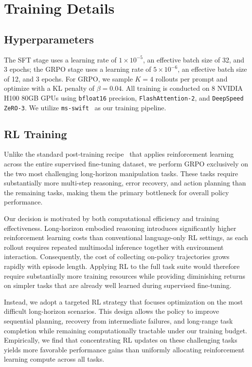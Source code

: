 \documentclass{llmxive}
\begin{document}
\section{Training Details}
\subsection{Hyperparameters}
The SFT stage uses a learning rate of $1\times10^{-5}$, an effective batch size of 32, and 3 epochs; the GRPO stage uses a learning rate of $5\times10^{-6}$, an effective batch size of 12, and 3 epochs.
For GRPO, we sample $K=4$ rollouts per prompt and optimize with a KL penalty of $\beta=0.04$. 
All training is conducted on 8 NVIDIA H100 80GB GPUs using \texttt{bfloat16} precision, \texttt{FlashAttention-2}, and \texttt{DeepSpeed ZeRO-3}. We utilize \texttt{ms-swift}~\citep{msswift2025} as our training pipeline.

\subsection{RL Training}

Unlike the standard post-training recipe~\citep{zhou2025r1zerosahamomentvisual, shao2024deepseekmathpushinglimitsmathematical} that applies reinforcement learning across the entire supervised fine-tuning dataset, we perform GRPO exclusively on the two most challenging long-horizon manipulation tasks. These tasks require substantially more multi-step reasoning, error recovery, and action planning than the remaining tasks, making them the primary bottleneck for overall policy performance.

Our decision is motivated by both computational efficiency and training effectiveness. Long-horizon embodied reasoning introduces significantly higher reinforcement learning costs than conventional language-only RL settings, as each rollout requires repeated multimodal inference together with environment interaction. Consequently, the cost of collecting on-policy trajectories grows rapidly with episode length. Applying RL to the full task suite would therefore require substantially more training resources while providing diminishing returns on simpler tasks that are already well learned during supervised fine-tuning.

Instead, we adopt a targeted RL strategy that focuses optimization on the most difficult long-horizon scenarios. This design allows the policy to improve sequential planning, recovery from intermediate failures, and long-range task completion while remaining computationally tractable under our training budget. Empirically, we find that concentrating RL updates on these challenging tasks yields more favorable performance gains than uniformly allocating reinforcement learning compute across all tasks.
\end{document}
